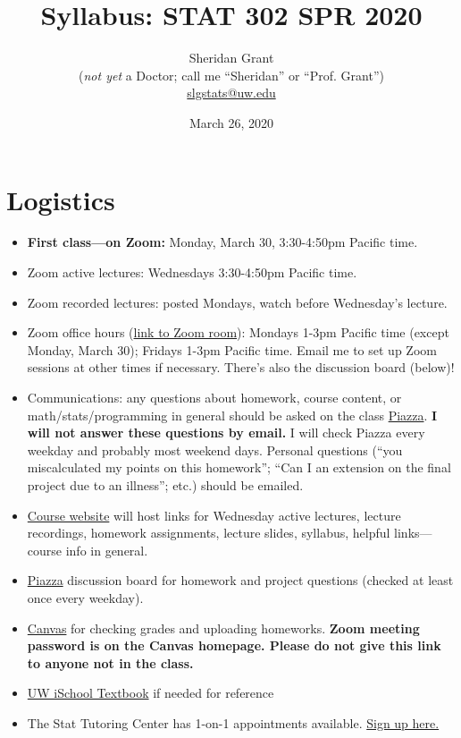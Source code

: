 \documentclass[12pt]{article}
\title{Syllabus: STAT 302 SPR 2020}
\author{Sheridan Grant\\(\textit{not yet} a Doctor; call me ``Sheridan'' or ``Prof. Grant'')\\\href{mailto:slgstats@uw.edu}{slgstats@uw.edu}}
\date{March 26, 2020}
\begin{document}
\sloppy

\maketitle

\section*{Logistics}

\begin{itemize}
	\item \textbf{First class---on Zoom:} Monday, March 30, 3:30-4:50pm Pacific time.
	\item Zoom active lectures: Wednesdays 3:30-4:50pm Pacific time.
	\item Zoom recorded lectures: posted Mondays, watch before Wednesday's lecture.
	\item Zoom office hours (\href{https://washington.zoom.us/j/7876861762?pwd=Nld6U2cvMWlUOVJUZ1B1UWVUbkFBQT09}{link to Zoom room}): Mondays 1-3pm Pacific time (except Monday, March 30); Fridays 1-3pm Pacific time. Email me to set up Zoom sessions at other times if necessary. There's also the discussion board (below)!
	\item Communications: any questions about homework, course content, or math/stats/programming in general should be asked on the class \href{https://piazza.com/washington/spring2020/stat302}{Piazza}. \textbf{I will not answer these questions by email.} I will check Piazza every weekday and probably most weekend days. Personal questions (``you miscalculated my points on this homework''; ``Can I an extension on the final project due to an illness''; etc.) should be emailed.
	\item \href{https://sheridanlgrant.github.io/teaching/STAT302_SPR2020}{Course website} will host links for Wednesday active lectures, lecture recordings, homework assignments, lecture slides, syllabus, helpful links---course info in general.
	\item \href{https://piazza.com/washington/spring2020/stat302}{Piazza} discussion board for homework and project questions (checked at least once every weekday).
	\item \href{https://canvas.uw.edu/}{Canvas} for checking grades and uploading homeworks. \textbf{Zoom meeting password is on the Canvas homepage. Please do not give this link to anyone not in the class.}
	\item \href{https://info201.github.io/}{UW iSchool Textbook} if needed for reference
	\item The Stat Tutoring Center has 1-on-1 appointments available. \href{https://www.stat.washington.edu/academics/tutoring}{Sign up here.}
\end{itemize}
\end{document}
